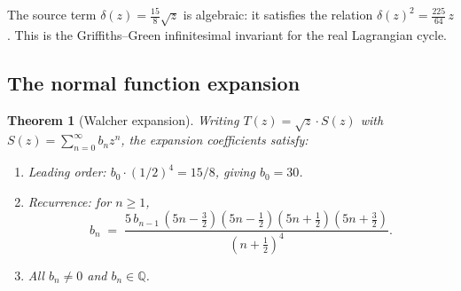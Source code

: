 \documentclass[11pt]{article}
\theoremstyle{plain}
\newtheorem{theorem}{Theorem}[section]
\theoremstyle{definition}
\theoremstyle{remark}
\newcommand{\Q}{\mathbb{Q}}
\begin{document}
The source term $\delta(z) = \tfrac{15}{8}\sqrt{z}$ is algebraic: it satisfies the relation $\delta(z)^2 = \tfrac{225}{64}\,z$. This is the Griffiths--Green infinitesimal invariant for the real Lagrangian cycle.

\subsection{The normal function expansion}

\begin{theorem}[Walcher expansion]\label{thm:walcher}
Writing $T(z) = \sqrt{z}\cdot S(z)$ with $S(z) = \sum_{n=0}^\infty b_n z^n$, the expansion coefficients satisfy:
\begin{enumerate}[nosep]
\item Leading order: $b_0 \cdot (1/2)^4 = 15/8$, giving $b_0 = 30$.
\item Recurrence: for $n \geq 1$,
\begin{equation}\label{eq:recurrence}
b_n \;=\; \frac{5\,b_{n-1}\,(5n - \tfrac{3}{2})(5n-\tfrac{1}{2})(5n+\tfrac{1}{2})(5n+\tfrac{3}{2})}{(n+\tfrac{1}{2})^4}.
\end{equation}
\item All $b_n \neq 0$ and $b_n \in \Q$.
\end{enumerate}
\end{theorem}
\end{document}
